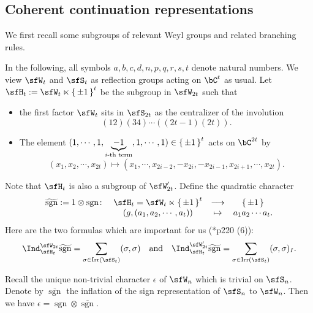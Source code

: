 \documentclass[12pt,a4paper]{amsart}
\newcommand{\sgn}{\operatorname{sgn}}
\numberwithin{equation}{section}
\theoremstyle{remark}
\def\Irr{\mathrm{Irr}}
\def\bsgn{\overline{\sgn}}
\def\AND{\quad \text{and} \quad}
\def\hsgn{\widetilde{\mathrm{sgn}}}
\begin{document}
\subsection{Coherent continuation representations}\label{subsec:explicitCoh}



We first recall some subgroups of relevant Weyl groups and related branching rules.


In the following, all symbols $a,b,c,d,n,p,q,r,s,t$ denote natural numbers. We view $\sfW_{t}$ and
$\sfS_{t}$ as reflection groups acting on $\bC^{t}$ as usual. Let
$\sfH_{t} := \sfW_t\ltimes \set{\pm 1}^t$ be the subgroup in $\sfW_{2t}$ such
that
\begin{itemize}
  \item the first factor $\sfW_{t}$ sits in $\sfS_{2t}$ as the centralizer of the
        involution
        \[
        (12)(34)\cdots ((2t-1)(2t)).
        \]
  \item The element $(1,\cdots,1, \underbrace{-1}_{i\text{-th
        term}}, 1, \cdots, 1)\in \set{\pm 1}^{t}$ acts on $\bC^{2t}$ by
        \[
        (x_{1},x_{2},\cdots, x_{2t} ) \mapsto (x_{1},\cdots, x_{2i-2}, -x_{2i},-x_{2i-1},x_{2i+1},\cdots, x_{2t}).
        \]
\end{itemize}
Note that $\sfH_{t}$ is also a subgroup of $\sfW'_{2t}$. Define the quadratic
character
\[
  \begin{array}{rccc}
    \hsgn := 1\otimes \sgn\colon & \sfH_{t}=  \sfW_{t}\ltimes \set{\pm 1}^{t}& \longrightarrow & \set{\pm 1}\\
                                 & (g,(a_{1},a_{2},\cdots, a_{t})) & \mapsto & a_{1}a_{2}\cdots a_{t}.
  \end{array}
\]
Here are the two formulas which are important for us (\cite{Mc}*{p220 (6)}):
\begin{equation}\label{eq:CC.C}
  \Ind_{\sfH_{t}}^{\sfW_{2t}} \hsgn = \sum_{\sigma\in \Irr(\sfS_{t})} (\sigma,\sigma)
  \AND
  \Ind_{\sfH_{t}}^{\sfW'_{2t}} \hsgn = \sum_{\sigma\in \Irr(\sfS_{t})} (\sigma,\sigma)_{I}.
\end{equation}


Recall the unique non-trivial character $\epsilon$ of $\sfW_{n}$ which is trivial on $\sfS_{n}$. Denote by $\bsgn$ the inflation of the sign representation of $\sfS_{n}$ to
$\sfW_{n}$. Then we have $\epsilon = \sgn \otimes \bsgn$.
\end{document}
